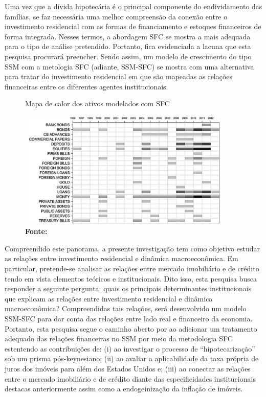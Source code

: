 Uma vez que a dívida hipotecária é o principal componente do endividamento das famílias, se faz necessária uma melhor compreensão da conexão entre o investimento residencial com as formas de financiamento e estoques financeiros de forma integrada.
Nesses termos, a abordagem SFC se mostra a mais adequada para o tipo de análise pretendido. Portanto, fica evidenciada a lacuna que esta pesquisa procurará preencher.
Sendo assim, um modelo de crescimento do tipo SSM com a metologia SFC (adiante, SSM-SFC) se mostra com uma alternativa para tratar do investimento residencial em que são mapeadas as relações financeiras entre os diferentes agentes institucionais.

\begin{figure}[htb]
	\centering
	\caption{Mapa de calor dos ativos modelados com SFC}
	\label{Heatmap}
	\includegraphics[width = 0.9\textwidth]{../../Escrita_Dissertacao/Da_Silveira_Dissertacao_Atual/Modelo/Caverzassi_Heatmap.png}
	\caption*{\textbf{Fonte:} \textcite[p.~4]{caverzasi_stock-flow_2013}}
\end{figure}




Compreendido este panorama, a presente investigação tem como objetivo estudar as relações entre investimento residencial e dinâmica macroeconômica. Em particular, pretende-se analisar as relações entre mercado imobiliário e de crédito tendo em vista elementos teóricos e institucionais. Dito isso, esta pesquisa busca responder a seguinte pergunta: quais os principais determinantes institucionais que explicam as relações entre investimento residencial e dinâmica macroeconômica? 
Compreendidas tais relações, será desenvolvido um modelo SSM-SFC para dar conta das relações entre lado real e financeiro da economia.
Portanto, esta pesquisa segue o caminho aberto por \textcite{brochier_supermultiplier_2018} ao adicionar um tratamento adequado das relações financeiras no SSM por meio da metodologia SFC estentendo as contribuições de: 
(i) \textcite{jorda_great_2014} ao investigar o processo de ``hipotecarização'' sob um prisma pós-keynesiano; 
(ii) \textcite{teixeira_crescimento_2015} ao avaliar a aplicabilidade da taxa própria de juros dos imóveis para além dos Estados Unidos e;
(iii) \textcite{da_silveira_investimento_2019} ao conectar as relações entre o mercado imobiliário e de crédito diante das especificidades institucionais destacas anteriormente assim como a endogeinização da inflação de imóveis. 